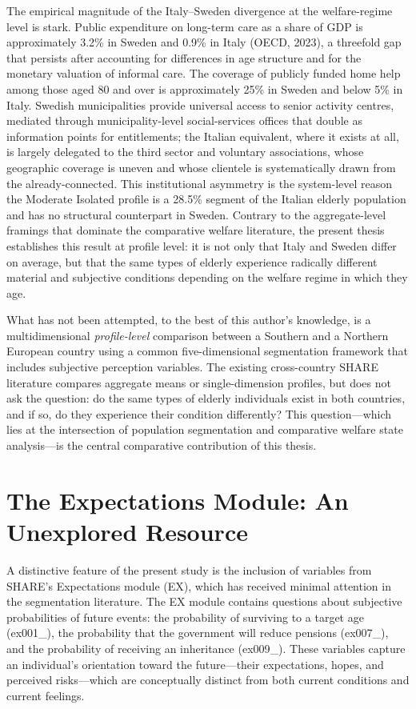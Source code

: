 The empirical magnitude of the Italy--Sweden divergence at the welfare-regime level is stark. Public expenditure on long-term care as a share of GDP is approximately 3.2\% in Sweden and 0.9\% in Italy (OECD, 2023), a threefold gap that persists after accounting for differences in age structure and for the monetary valuation of informal care. The coverage of publicly funded home help among those aged 80 and over is approximately 25\% in Sweden and below 5\% in Italy. Swedish municipalities provide universal access to senior activity centres, mediated through municipality-level social-services offices that double as information points for entitlements; the Italian equivalent, where it exists at all, is largely delegated to the third sector and voluntary associations, whose geographic coverage is uneven and whose clientele is systematically drawn from the already-connected. This institutional asymmetry is the system-level reason the Moderate Isolated profile is a 28.5\% segment of the Italian elderly population and has no structural counterpart in Sweden. Contrary to the aggregate-level framings that dominate the comparative welfare literature, the present thesis establishes this result at profile level: it is not only that Italy and Sweden differ on average, but that the same types of elderly experience radically different material and subjective conditions depending on the welfare regime in which they age.

What has not been attempted, to the best of this author's knowledge, is a multidimensional \emph{profile-level} comparison between a Southern and a Northern European country using a common five-dimensional segmentation framework that includes subjective perception variables. The existing cross-country SHARE literature compares aggregate means or single-dimension profiles, but does not ask the question: do the same types of elderly individuals exist in both countries, and if so, do they experience their condition differently? This question---which lies at the intersection of population segmentation and comparative welfare state analysis---is the central comparative contribution of this thesis.

\section{The Expectations Module: An Unexplored Resource}
A distinctive feature of the present study is the inclusion of variables from SHARE's Expectations module (EX), which has received minimal attention in the segmentation literature. The EX module contains questions about subjective probabilities of future events: the probability of surviving to a target age (ex001\_), the probability that the government will reduce pensions (ex007\_), and the probability of receiving an inheritance (ex009\_). These variables capture an individual's orientation toward the future---their expectations, hopes, and perceived risks---which are conceptually distinct from both current conditions and current feelings.

